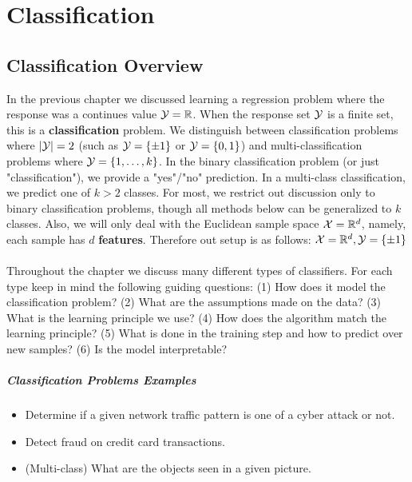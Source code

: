 \chapter{Classification}
\section{Classification Overview}
In the previous chapter we discussed learning a regression problem where the response was a continues value $\mathcal{Y}=\mathbb{R}$. When the response set $\mathcal{Y}$ is a finite set, this is a \textbf{classification} problem. We distinguish between classification problems where $\left|\mathcal{Y}\right|=2$ (such as $\mathcal{Y}=\left\{\pm 1\right\}$ or $\mathcal{Y}=\left\{0,1\right\}$) and multi-classification problems where $\mathcal{Y}=\left\{1,\ldots,k\right\}$. In the binary classification problem (or just "classification"), we provide a "yes"/"no" prediction. In a multi-class classification, we predict one of $k>2$ classes. For most, we restrict out discussion only to binary classification problems, though all methods below can be generalized to $k$ classes. Also, we will only deal with the Euclidean sample space $\mathcal{X}=\mathbb{R}^d$, namely, each sample has $d$ \textbf{features}. Therefore out setup is as follows: $ \mathcal{X}=\mathbb{R}^d,\mathcal{Y}=\left\{\pm 1\right\} $
~\\

Throughout the chapter we discuss many different types of classifiers. For each type keep in mind the following guiding questions: (1) How does it model the classification problem? (2) What are the assumptions made on the data? (3) What is the learning principle we use? (4) How does the algorithm match the learning principle? (5) What is done in the training step and how to predict over new samples? (6) Is the model interpretable?
~\\
\paragraph{Classification Problems Examples}
\begin{itemize}
	\item Determine if a given network traffic pattern is one of a cyber attack or not.
	\item Detect fraud on credit card transactions.
	\item (Multi-class) What are the objects seen in a given picture.
\end{itemize}

